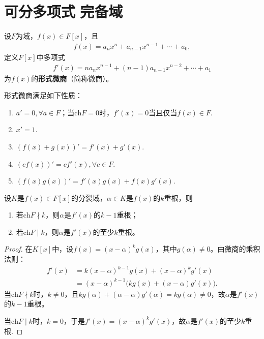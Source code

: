 \documentclass[../../main.tex]{subfiles}%
\begin{document}
\section{可分多项式$\,\,$完备域}

\begin{definition}
设$F$为域，$f(x)\in F[x]$，且
\begin{align*}
f(x)=a_nx^n+a_{n-1}x^{n-1}+\cdots+a_0,
\end{align*}
定义$F[x]$中多项式
\begin{align*}
f'(x)=na_nx^{n-1}+(n-1)a_{n-1}x^{n-2}+\cdots+a_1
\end{align*}
为$f(x)$的\textbf{形式微商}（简称微商）。
\end{definition}

\begin{remark}
形式微商满足如下性质：
\begin{enumerate}[(1)]
\item $a'=0,\forall a\in F$；当$\mathrm{ch}F=0$时，$f'(x)=0$当且仅当$f(x)\in F$.
\item $x'=1$.
\item $(f(x)+g(x))'=f'(x)+g'(x)$.
\item $(cf(x))'=cf'(x),\forall c\in F$.
\item $(f(x)g(x))'=f'(x)g(x)+f(x)g'(x)$.
\end{enumerate}
\end{remark}

\begin{theorem}
设$K$是$f(x)\in F[x]$的分裂域，$\alpha\in K$是$f(x)$的$k$重根，则
\begin{enumerate}[(1)]
\item 若$\mathrm{ch}F\nmid k$，则$\alpha$是$f'(x)$的$k-1$重根；
\item 若$\mathrm{ch}F\mid k$，则$\alpha$是$f'(x)$的至少$k$重根。
\end{enumerate}
\end{theorem}

\begin{proof}

在$K[x]$中，设$f(x)=(x-\alpha)^kg(x)$，其中$g(\alpha)\neq0$。由微商的乘积法则：
\begin{align*}
f'(x)&=k(x-\alpha)^{k-1}g(x)+(x-\alpha)^kg'(x) \\
&=(x-\alpha)^{k-1}\big(kg(x)+(x-\alpha)g'(x)\big).
\end{align*}
当$\mathrm{ch}F\nmid k$时，$k\neq0$，且$kg(\alpha)+(\alpha-\alpha)g'(\alpha)=kg(\alpha)\neq0$，故$\alpha$是$f'(x)$的$k-1$重根。

当$\mathrm{ch}F\mid k$时，$k=0$，于是$f'(x)=(x-\alpha)^kg'(x)$，故$\alpha$是$f'(x)$的至少$k$重根.

\end{proof}
\end{document}
